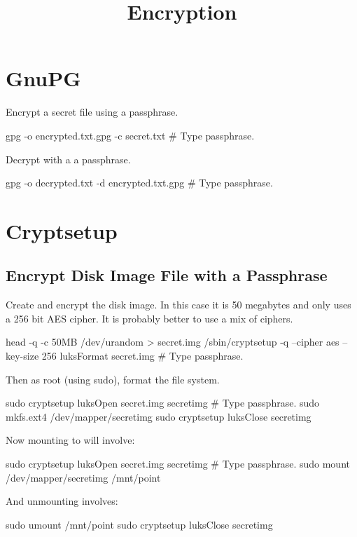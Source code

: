 
\title{Encryption}
\date{}



\tableofcontents


\section{GnuPG}

Encrypt a secret file using a passphrase.
\begin{code}
gpg -o encrypted.txt.gpg -c secret.txt
# Type passphrase.
\end{code}

Decrypt with a a passphrase.
\begin{code}
gpg -o decrypted.txt -d encrypted.txt.gpg
# Type passphrase.
\end{code}


\section{Cryptsetup}

\subsection{Encrypt Disk Image File with a Passphrase}

Create and encrypt the disk image.
In this case it is 50 megabytes and only uses a 256 bit AES cipher.
It is probably better to use a mix of ciphers.
\begin{code}
head -q -c 50MB /dev/urandom > secret.img
/sbin/cryptsetup -q --cipher aes --key-size 256 luksFormat secret.img
# Type passphrase.
\end{code}
Then as root (using sudo), format the file system.
\begin{code}
sudo cryptsetup luksOpen secret.img secretimg
# Type passphrase.
sudo mkfs.ext4 /dev/mapper/secretimg
sudo cryptsetup luksClose secretimg
\end{code}

Now mounting to  will involve:
\begin{code}
sudo cryptsetup luksOpen secret.img secretimg
# Type passphrase.
sudo mount /dev/mapper/secretimg /mnt/point
\end{code}

And unmounting involves:
\begin{code}
sudo umount /mnt/point
sudo cryptsetup luksClose secretimg
\end{code}



